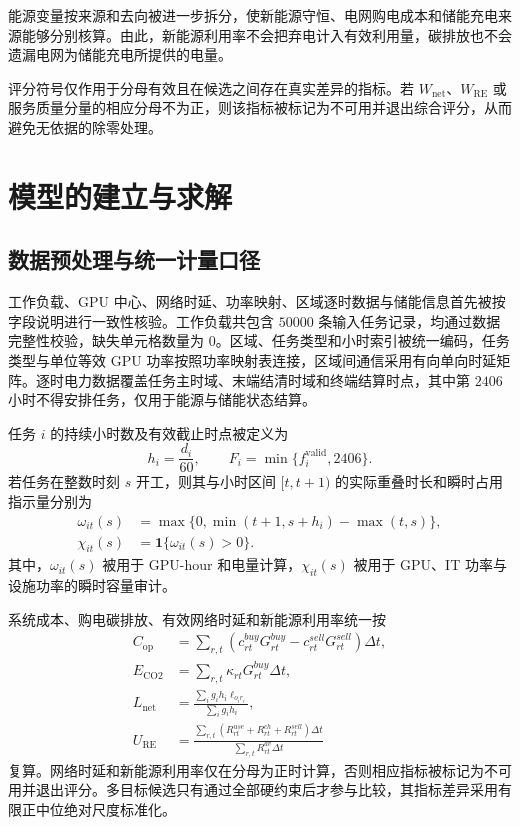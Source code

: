 \documentclass[withoutpreface,bwprint]{cumcmthesis}
\begin{document}
能源变量按来源和去向被进一步拆分，使新能源守恒、电网购电成本和储能充电来源能够分别核算。由此，新能源利用率不会把弃电计入有效利用量，碳排放也不会遗漏电网为储能充电所提供的电量。

评分符号仅作用于分母有效且在候选之间存在真实差异的指标。若 $W_{\mathrm{net}}$、$W_{\mathrm{RE}}$ 或服务质量分量的相应分母不为正，则该指标被标记为不可用并退出综合评分，从而避免无依据的除零处理。

\section{模型的建立与求解}

\subsection{数据预处理与统一计量口径}

工作负载、GPU 中心、网络时延、功率映射、区域逐时数据与储能信息首先被按字段说明进行一致性核验。工作负载共包含 $50000$ 条输入任务记录，均通过数据完整性校验，缺失单元格数量为 $0$。区域、任务类型和小时索引被统一编码，任务类型与单位等效 GPU 功率按照功率映射表连接，区域间通信采用有向单向时延矩阵。逐时电力数据覆盖任务主时域、末端结清时域和终端结算时点，其中第 $2406$ 小时不得安排任务，仅用于能源与储能状态结算。

任务 $i$ 的持续小时数及有效截止时点被定义为
\begin{equation}
h_i=\frac{d_i}{60},\qquad F_i=\min\{f_i^{\mathrm{valid}},2406\}.
\label{eq:duration_deadline}
\end{equation}
若任务在整数时刻 $s$ 开工，则其与小时区间 $[t,t+1)$ 的实际重叠时长和瞬时占用指示量分别为
\begin{align}
\omega_{it}(s)&=\max\{0,\min(t+1,s+h_i)-\max(t,s)\},\\
\chi_{it}(s)&=\mathbf 1\{\omega_{it}(s)>0\}.
\end{align}
其中，$\omega_{it}(s)$ 被用于 GPU-hour 和电量计算，$\chi_{it}(s)$ 被用于 GPU、IT 功率与设施功率的瞬时容量审计。

系统成本、购电碳排放、有效网络时延和新能源利用率统一按
\begin{align}
C_{\mathrm{op}}
&=\sum_{r,t}\left(c_{rt}^{buy}G_{rt}^{buy}
-c_{rt}^{sell}G_{rt}^{sell}\right)\Delta t,\\
E_{\mathrm{CO2}}
&=\sum_{r,t}\kappa_{rt}G_{rt}^{buy}\Delta t,\\
L_{\mathrm{net}}
&=\frac{\sum_i g_ih_i\ell_{o_ir_i}}{\sum_i g_ih_i},\\
U_{\mathrm{RE}}
&=\frac{\sum_{r,t}(R_{rt}^{use}+R_{rt}^{ch}+R_{rt}^{sell})\Delta t}
{\sum_{r,t}R_{rt}^{av}\Delta t}
\end{align}
复算。网络时延和新能源利用率仅在分母为正时计算，否则相应指标被标记为不可用并退出评分。多目标候选只有通过全部硬约束后才参与比较，其指标差异采用有限正中位绝对尺度标准化\cite{huber1964robust,miettinen1999nonlinear}。
\end{document}
